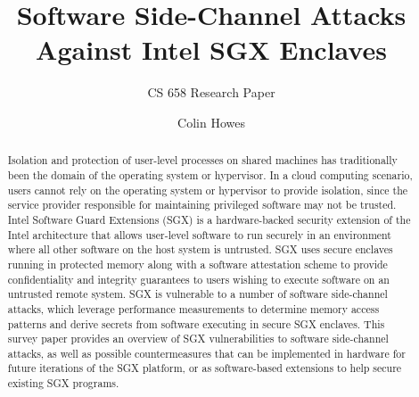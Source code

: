 \documentclass[sigconf]{acmart}
\begin{document}
\title{Software Side-Channel Attacks Against Intel SGX Enclaves}
\subtitle{CS 658 Research Paper}


\author{Colin Howes}

\begin{abstract}

Isolation and protection of user-level processes on shared machines has traditionally been the domain of the operating system or hypervisor. In a cloud computing scenario, users cannot rely on the operating system or hypervisor to provide isolation, since the service provider responsible for maintaining privileged software may not be trusted. Intel Software Guard Extensions (SGX) is a hardware-backed security extension of the Intel architecture that allows user-level software to run securely in an environment where all other software on the host system is untrusted. SGX uses secure enclaves running in protected memory along with a software attestation scheme to provide confidentiality and integrity guarantees to users wishing to execute software on an untrusted remote system. SGX is vulnerable to a number of software side-channel attacks, which leverage performance measurements to determine memory access patterns and derive secrets from software executing in secure SGX enclaves. This survey paper provides an overview of SGX vulnerabilities to software side-channel attacks, as well as possible countermeasures that can be implemented in hardware for future iterations of the SGX platform, or as software-based extensions to help secure existing SGX programs.

\end{abstract}

\maketitle




 
\end{document}
